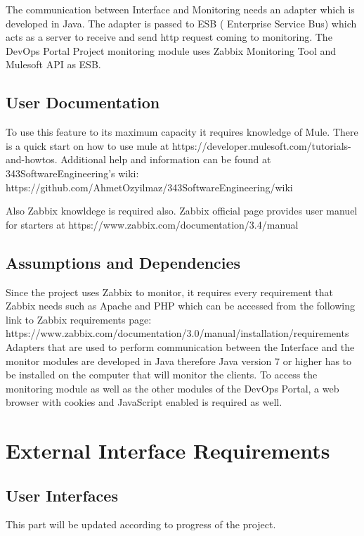 \documentclass{article}
\begin{document}
  The communication between Interface and Monitoring needs an adapter which is developed in Java. The adapter is passed to ESB ( Enterprise Service Bus) which acts as a server to receive and send http request coming to monitoring. The DevOps Portal Project monitoring module uses Zabbix Monitoring Tool and Mulesoft API as ESB.


\subsection{User Documentation}

To use this feature to its maximum capacity it requires knowledge of Mule. There is a quick start on how to use mule at  https://developer.mulesoft.com/tutorials-and-howtos. 
Additional help and information can be found at 343SoftwareEngineering’s wiki: https://github.com/AhmetOzyilmaz/343SoftwareEngineering/wiki
 
Also Zabbix knowldege is required also. Zabbix official page provides user manuel for starters at https://www.zabbix.com/documentation/3.4/manual



\subsection{Assumptions and Dependencies}
Since the project uses Zabbix to monitor, it requires every requirement that Zabbix needs such as Apache and PHP which can be accessed from the following link to Zabbix requirements page:
https://www.zabbix.com/documentation/3.0/manual/installation/requirements
Adapters that are used to perform communication between the Interface and the monitor modules are developed in Java therefore Java version 7 or higher has to be installed on the computer that will monitor the clients. 
To access the monitoring module as well as the other modules of the DevOps Portal, a web browser with cookies and JavaScript enabled is required as well.

\section{External Interface Requirements}



\subsection{User Interfaces}

This part will be updated according to progress of the project.
\end{document}
